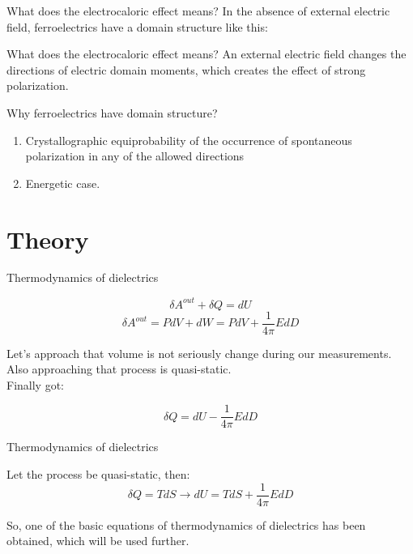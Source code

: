 \documentclass [xcolor=svgnames, t] {beamer}
\begin{document}
\begin{frame}{What does the electrocaloric effect means?
}
In the absence of external electric field, ferroelectrics have a domain structure like this:
\end{frame}

\begin{frame}{What does the electrocaloric effect means?
}
An external electric field changes the directions of electric domain moments, which creates the effect of strong polarization.

  
\end{frame}
\begin{frame}{Why ferroelectrics have domain structure?
}
\begin{enumerate}
\vspace{1.8cm}
    \item Crystallographic equiprobability of the occurrence of spontaneous polarization in any of the allowed directions
\item Energetic case. 
\end{enumerate}
\end{frame}
\section{Theory}
\begin{frame}{Thermodynamics of dielectrics}
\begin{block}{}
\begin{equation}
 \delta A^{out} + \delta Q = dU
 \end{equation}
 \begin{equation}
\delta A^{out} = PdV + dW = PdV + \frac{1}{4\pi}EdD
\end{equation}
\end{block}  
Let’s approach that volume is not seriously change during our measurements.
Also approaching that process is quasi-static.\\ Finally got:

\begin{block}{}
\begin{equation}
   \delta Q = dU - \frac{1}{4\pi}EdD
   \end{equation}
\end{block}
\end{frame}
\begin{frame}{Thermodynamics of dielectrics
}
\vspace{0.8cm}
\begin{block}{Let the process be quasi-static, then:
}
\begin{equation}
\delta Q = TdS \longrightarrow dU = TdS + \frac{1}{4\pi}EdD
\end{equation}
\end{block}{} 
\vspace{0.2cm}
So, one of the basic equations of thermodynamics of dielectrics has been obtained, which will be used further.  
\end{frame}{}
\end{document}
